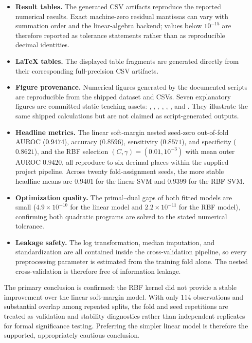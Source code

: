 \documentclass[11pt,a4paper]{article}
\numberwithin{equation}{section} %
\begin{document}
\begin{itemize}
    \item \textbf{Result tables.} The generated CSV artifacts reproduce the
    reported numerical results. Exact machine-zero residual mantissas can vary
    with summation order and the linear-algebra backend; values below
    $10^{-15}$ are therefore reported as tolerance statements rather than as
    reproducible decimal identities.
    \item \textbf{LaTeX tables.} The displayed table fragments are generated
    directly from their corresponding full-precision CSV artifacts.
    \item \textbf{Figure provenance.} Numerical figures generated by the
    documented scripts are reproducible from the shipped dataset and CSVs.
    Seven explanatory figures are committed static teaching assets:
    , ,
    , ,
    , , and
    . They illustrate the same shipped
    calculations but are not claimed as script-generated outputs.
    \item \textbf{Headline metrics.} The linear soft-margin nested
    seed-zero out-of-fold AUROC ($0.9474$), accuracy ($0.8596$), sensitivity
    ($0.8571$), and specificity ($0.8621$), and the RBF selection
    $(C,\gamma)=(0.01,10^{-3})$ with mean outer AUROC $0.9420$, all reproduce
    to six decimal places within the supplied project pipeline. Across twenty
    fold-assignment seeds, the more stable headline means are $0.9401$ for the
    linear SVM and $0.9399$ for the RBF SVM.
    \item \textbf{Optimization quality.} The primal--dual gaps of both fitted
    models are small ($4.9\times10^{-10}$ for the linear model and
    $2.2\times10^{-11}$ for the RBF model), confirming both quadratic programs
    are solved to the stated numerical tolerance.
    \item \textbf{Leakage safety.} The log transformation, median imputation,
    and standardization are all contained inside the cross-validation
    pipeline, so every preprocessing parameter is estimated from the training
    fold alone. The nested cross-validation is therefore free of information
    leakage.
\end{itemize}

The primary conclusion is confirmed: the RBF kernel did not provide a stable
improvement over the linear soft-margin model. With only 114 observations and
substantial overlap among repeated splits, the fold and seed repetitions are
treated as validation and stability diagnostics rather than independent
replicates for formal significance testing. Preferring the simpler linear
model is therefore the supported, appropriately cautious conclusion.
\end{document}
